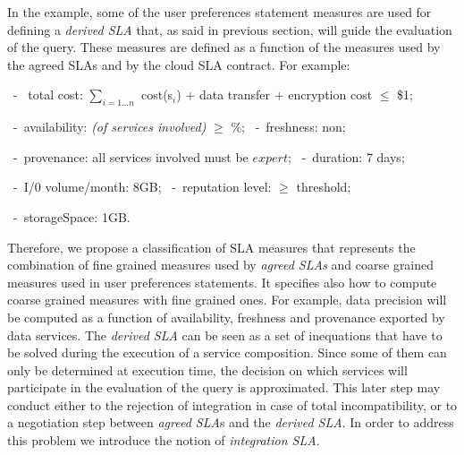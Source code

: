 In the example, some of the user preferences statement measures are used for defining a {\em derived SLA} that, as said in previous section, will guide the evaluation of the query. 
These measures are defined as a function of the measures used by the agreed SLAs and by the cloud SLA contract. For example: 
\begin{trivlist}\sf\footnotesize
 \item[~-~ total cost:] $\sum_{i = 1\dots n}$ cost(s$_i$) + data transfer + encryption cost $\leq$ \$1;
 \item[~-~availability:] {\em (of services involved)} $\geq$ {$\%$};
 ~-~freshness: non;
 \item[~-~provenance:] all services involved must be $expert$;
  ~-~duration: 7 days;
 \item[~-~I/0 volume/month:] 8GB;
  ~-~reputation level: $\geq$ threshold;
 \item[~-~storageSpace:] 1GB.
 \end{trivlist} 
 
Therefore, we propose a classification of SLA measures that represents the combination of fine grained measures used by {\em agreed SLAs} and coarse grained measures used in user preferences statements. 
It specifies also how to compute coarse grained measures with fine grained ones. 
For example, data precision will be computed as a function of availability, freshness and provenance exported by data services. The {\em derived SLA} can be seen as a set of inequations that have to be solved during the execution of a service composition. Since some of them can only be determined at execution time, the decision on which services will participate in the evaluation of the query is approximated.  
This later step may conduct either to the rejection of integration in case of total incompatibility, or to a negotiation step between {\em agreed SLA}s and the {\em derived SLA}. In order to address this problem we introduce the notion of  {\em integration SLA}. 
 
 

